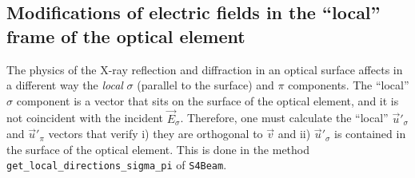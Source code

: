 \documentclass{iucr}
\begin{document}
\subsection{Modifications of electric fields in the ``local'' frame of the optical element}
\label{sec:localoe}


The physics of the X-ray reflection and diffraction in an optical surface affects in a different way 
the {\it local} $\sigma$ (parallel to the surface) and $\pi$ components. The ``local'' $\sigma$ component
is a vector that sits on the surface of the optical element, and it is not coincident with the incident $\vec{E}_\sigma$.
Therefore, one must calculate the ``local'' $\vec{u}'_\sigma$ and $\vec{u}'_\pi$ vectors that verify
i) they are orthogonal to $\vec{v}$ and ii) $\vec{u}'_\sigma$ is contained in the surface of the optical element. 
This is done in the method {\tt get\_local\_directions\_sigma\_pi} of {\tt S4Beam}.




\end{document}
